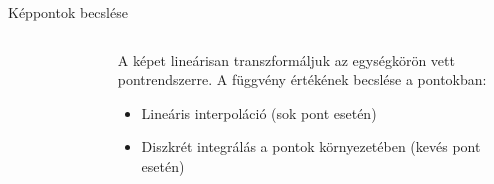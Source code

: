 \documentclass{beamer}
\begin{document}
\begin{frame}{Képpontok becslése}
\begin{columns}
\begin{column}{0.5\textwidth}
\begin{figure}
\begin{subfigure}{.48\textwidth}
            \end{subfigure}
        \end{figure}
    \end{column}
    \begin{column}{0.5\textwidth}
        A képet lineárisan transzformáljuk az egységkörön vett pontrendszerre.
        \vskip 3mm
        A függvény értékének becslése a pontokban:
        \begin{itemize}
            \item Lineáris interpoláció (sok pont esetén)
            \item Diszkrét integrálás a pontok környezetében (kevés pont esetén)
        \end{itemize}
    \end{column}
\end{columns}

\end{frame}
\end{document}
